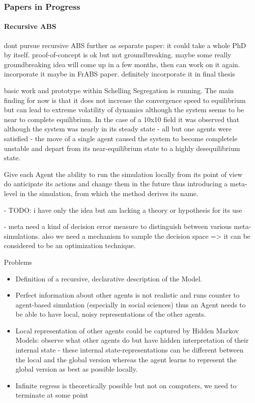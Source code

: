 \subsubsection{Papers in Progress}
\paragraph{Recursive ABS}
dont pursue recursive ABS further as separate paper: it could take a whole PhD by itself. proof-of-concept is ok but not groundbreaking. maybe some really groundbreaking idea will come up in a few months, then can work on it again. incorporate it maybe in FrABS paper. definitely incorporate it in final thesis

basic work and prototype within Schelling Segregation is running. The main finding for now is that it does not increase the convergence speed to equilibrium but can lead to extreme volatility of dynamics although the system seems to be near to complete equilibrium. In the case of a 10x10 field it was observed that although the system was nearly in its steady state - all but one agents were satisfied - the move of a single agent caused the system to become completele unstable and depart from its near-equilibrium state to a highly desequilibrium state.

Give each  Agent the ability to run the simulation locally from its point of view do anticipate its actions and change them in the future thus introducing a meta-level in the simulation, from which the method derives its name.

- TODO:  i have only the idea but am lacking a theory or hypothesis for its use

- meta need a kind of decision error measure to distinguish between various meta-simulations. also we need a mechanism to sample the decision space => it can be considered to be an optimization technique.

Problems
\begin{itemize}
	\item Definition of a recursive, declarative description of the Model.
	\item Perfect information about other agents is not realistic and runs counter to agent-based simulation (especially in social sciences) thus an Agent needs to be able to have local, noisy representations of the other agents.
	\item Local representation of other agents could be captured by Hidden Markov Models: observe what other agents do but have hidden interpretation of their internal state - these internal state-representations can be different between the local and the global version whereas the agent learns to represent the global version as best as possible locally.
	\item Infinite regress is theoretically possible but not on computers, we need to terminate at some point
\end{itemize}

